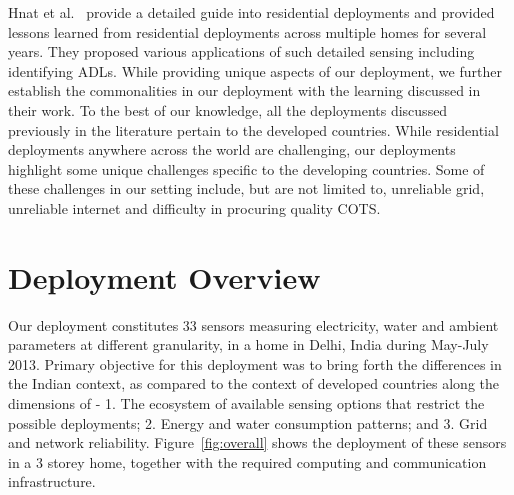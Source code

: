 \documentclass[10pt]{sensys-proc}
\newcommand{\figref}[1]{Figure~\ref{#1}}
\begin{document}
 Hnat et al.~\cite{hitchhiker_residential} provide a detailed guide into residential deployments and provided lessons learned from residential deployments across multiple homes for several years. They proposed various applications of such detailed sensing including identifying ADLs. While providing unique aspects of our deployment, we further establish the commonalities in our deployment with the learning discussed in their work. %
To the best of our knowledge, all the deployments discussed previously in the literature pertain to the developed countries. While residential deployments anywhere across the world are challenging, our deployments highlight some unique challenges specific to the developing countries. Some of these challenges in our setting include, but are not limited to, unreliable grid, unreliable internet and difficulty in procuring quality COTS.

\vspace{-1mm}
\section{Deployment Overview}
Our deployment constitutes 33 sensors measuring electricity, water and ambient parameters at different granularity, in a home in Delhi, India during May-July 2013. Primary objective for this deployment was to bring forth the differences in the Indian context, as compared to the context of developed countries along the dimensions of - 1. The ecosystem of available sensing options that restrict the possible deployments; 2. Energy and water consumption patterns; and 3. Grid and network reliability. \figref{fig:overall} shows the deployment of these sensors in a 3 storey home, together with the required computing and communication infrastructure. %
\end{document}
